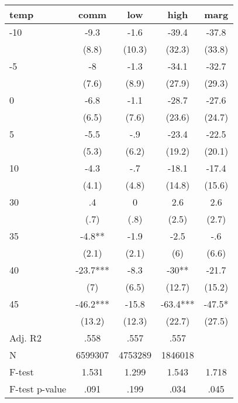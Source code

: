 \documentclass[]{article}
\begin{document}
\begin{tabular}{lcccc} \hline
temp & comm & low & high & marg \\ \hline
-10 & -9.3 & -1.6 & -39.4 & -37.8 \\
 & (8.8) & (10.3) & (32.3) & (33.8) \\
-5 & -8 & -1.3 & -34.1 & -32.7 \\
 & (7.6) & (8.9) & (27.9) & (29.3) \\
0 & -6.8 & -1.1 & -28.7 & -27.6 \\
 & (6.5) & (7.6) & (23.6) & (24.7) \\
5 & -5.5 & -.9 & -23.4 & -22.5 \\
 & (5.3) & (6.2) & (19.2) & (20.1) \\
10 & -4.3 & -.7 & -18.1 & -17.4 \\
 & (4.1) & (4.8) & (14.8) & (15.6) \\
30 & .4 & 0 & 2.6 & 2.6 \\
 & (.7) & (.8) & (2.5) & (2.7) \\
35 & -4.8** & -1.9 & -2.5 & -.6 \\
 & (2.1) & (2.1) & (6) & (6.6) \\
40 & -23.7*** & -8.3 & -30** & -21.7 \\
 & (7) & (6.5) & (12.7) & (15.2) \\
45 & -46.2*** & -15.8 & -63.4*** & -47.5* \\
 & (13.2) & (12.3) & (22.7) & (27.5) \\
\hline Adj. R2 & .558 & .557 & .557 &  \\
N & 6599307 & 4753289 & 1846018 &  \\
F-test & 1.531 & 1.299 & 1.543 & 1.718 \\
 F-test p-value & .091 & .199 & .034 & .045 \\ \hline
\end{tabular}
\end{document}
